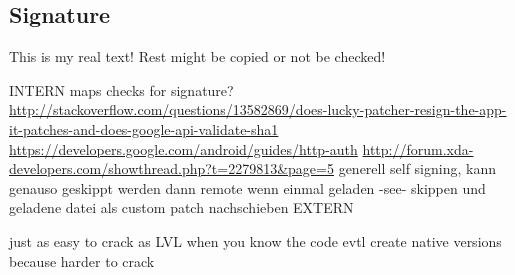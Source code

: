 \subsection{Signature}\label{subsection:evaluation-tampering-signature}

This is my real text! Rest might be copied or not be checked!

INTERN
maps checks for signature?\newline
\url{http://stackoverflow.com/questions/13582869/does-lucky-patcher-resign-the-app-it-patches-and-does-google-api-validate-sha1}\newline
\url{https://developers.google.com/android/guides/http-auth}
\url{http://forum.xda-developers.com/showthread.php?t=2279813&page=5}\newline
generell\newline
self signing, kann genauso geskippt werden dann
remote\newline
wenn einmal geladen -see- skippen und geladene datei als custom patch nachschieben
EXTERN


just as easy to crack as LVL when you know the code\newline
evtl create native versions because harder to crack\newline
